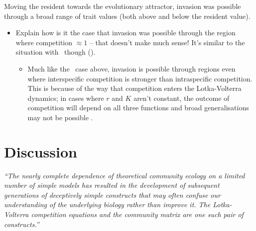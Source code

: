 \documentclass[a4paper,11pt]{article}
\begin{document}
Moving the resident towards the evolutionary attractor, invasion was
possible through a broad range of trait values (both above and below
the resident value).
\begin{itemize}
\item Explain how is it the case that invasion was possible through the
  region where competition $\approx 1$ -- that doesn't make much sense!
  It's similar to the situation with \hmat\ though (\TODO).
  \begin{itemize}
  \item Much like the \hmat\ case above, invasion is possible through
    regions even where interspecific competition is stronger than
    intraspecific competition.  This is because of the way that
    competition enters the Lotka-Volterra dynamics; in cases where $r$
    and $K$ aren't constant, the outcome of competition will depend on
    all three functions and broad generalisations may not be possible
    \citep[c.f.][]{Leimar-2013}.
  \end{itemize}
\end{itemize}


\section{Discussion}


\emph{``The nearly complete dependence of theoretical community ecology on a
limited number of simple models has resulted in the development of subsequent
generations of deceptively simple constructs that may often confuse our
understanding of the underlying biology rather than improve it. The
Lotka-Volterra competition equations and the community matrix are one such
pair of constructs.''} \citep{Neill-1974}
\end{document}
